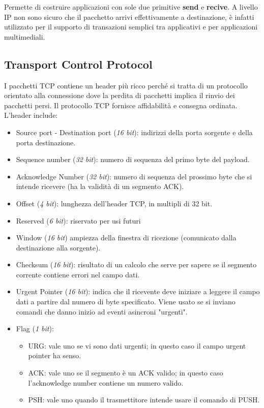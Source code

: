 \documentclass[oneside,a4paper,11pt]{book}
\theoremstyle{italicstyle}
\theoremstyle{normStyle}
\begin{document}
Permette di costruire applicazioni con sole due primitive \textbf{send} e 
\textbf{recive}.
A livello IP non sono sicuro che il pacchetto arrivi effettivamente a 
destinazione, è infatti utilizzato per il supporto di transazioni semplici tra applicativi
e per applicazioni multimediali.
\subsection{Transport Control Protocol}
I pacchetti TCP contiene un header più ricco perché si tratta di un protocollo
orientato alla connessione dove la perdita di pacchetti implica il rinvio dei pacchetti persi.
Il protocollo TCP fornisce affidabilità e consegna ordinata.
L'header include:
\begin{itemize}
  \item Source port - Destination port (\textit{16 bit}): indirizzi della porta
  sorgente e della porta destinazione.
  \item Sequence number (\textit{32 bit}): numero di sequenza del primo byte del payload.
  \item Acknowledge Number (\textit{32 bit}): numero di sequenza del prossimo byte che si intende 
  ricevere (ha la validità di un segmento ACK).
  \item Offset (\textit{4 bit}): lunghezza dell'header TCP, in multipli di 32 bit.
  \item Reserved (\textit{6 bit}): riservato per usi futuri
  \item Window (\textit{16 bit}) ampiezza della finestra di ricezione (comunicato
  dalla destinazione alla sorgente).
  \item Checksum (\textit{16 bit}): risultato di un calcolo che serve per sapere se
  il segmento corrente contiene errori nel campo dati.
  \item Urgent Pointer (\textit{16 bit}): indica che il ricevente deve iniziare a 
  leggere il campo dati a partire dal numero di byte specificato.
  Viene usato se si inviano 
  comandi che danno inizio ad eventi asincroni "urgenti".
  \item Flag (\textit{1 bit}):
  \begin{itemize}
    \item URG: vale uno se vi sono dati urgenti; 
    in questo caso il campo urgent pointer ha senso.
    \item ACK: vale uno se il segmento è un ACK valido; 
    in questo caso l’acknowledge number contiene un numero valido.
    \item PSH: vale uno quando il trasmettitore intende usare il comando di PUSH.

\end{itemize}
\end{itemize}
\end{document}
